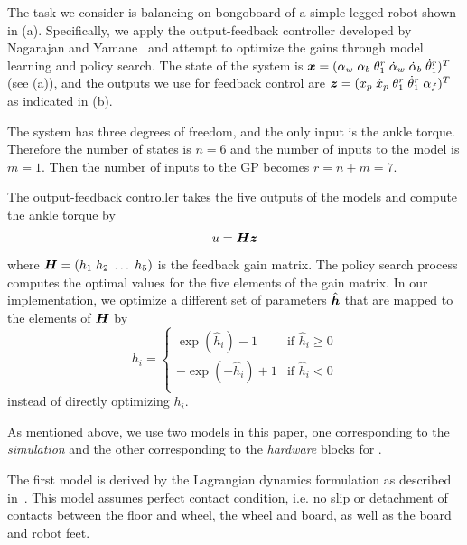 The task we consider is balancing on bongoboard of a simple legged
robot shown in (a).
Specifically, we apply the output-feedback controller developed by
Nagarajan and Yamane~\cite{bib-icra14-universal} and attempt to optimize
the gains through model learning and policy search.
The state of the system is $\mbox{\boldmath \(x\)} = (\alpha_w\; \alpha_b\;
\theta_1^r\; \dot{\alpha}_w\; \dot{\alpha}_b\; \dot{\theta}_1^r)^T$ (see
(a)), and the outputs we use for feedback control
are 
$\mbox{\boldmath \(z\)} = (x_p\; \dot{x}_p\; \theta_1^r\; \dot{\theta}_1^r\; \alpha_f)^T$ as
indicated in (b).

The system has three degrees of freedom, and the only input is the
ankle torque.
Therefore the number of states is $n = 6$ and the number of inputs to
the model is $m=1$.
Then the number of inputs to the GP becomes $r=n+m=7$.

The output-feedback controller takes the five outputs of the models and
compute the ankle torque by
\begin{equation}
u = \mbox{\boldmath \(H\)} \mbox{\boldmath \(z\)}
\end{equation}
where $\mbox{\boldmath \(H\)} = \left(h_1\; h_2\; \ldots\; h_5\right)$ is the
feedback gain matrix.
The policy search process computes the optimal values for the five
elements of the gain matrix. 
In our implementation, we optimize a different set of parameters
$\hat{\mbox{\boldmath \(h\)}}$ that are mapped to the elements of $\mbox{\boldmath \(H\)}$ by 
\begin{equation}
h_i = \left\{ 
\begin{array}{cc}
\exp(\hat{h}_i)-1 & \mbox{if }\hat{h}_i \geq 0 \\
-\exp(-\hat{h}_i)+1 & \mbox{if }\hat{h}_i < 0 \\
\end{array}
\right.
\end{equation}
instead of directly optimizing $h_i$.

As mentioned above, we use two models in this paper, one corresponding
to the {\em simulation} and the other corresponding to the {\em
hardware} blocks for .

The first model is derived by the Lagrangian dynamics formulation as
described in~\cite{bib-icra14-universal}.  This model assumes perfect
contact condition, i.e. no slip or detachment of contacts between the
floor and wheel, the wheel and board, as well as the board and robot
feet.

